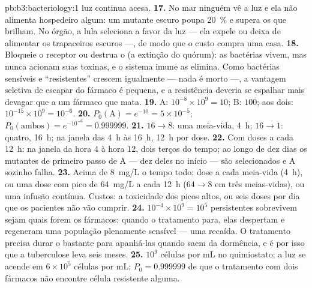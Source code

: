 \begin{solution}{pb:b3:bacteriology:1}
luz continua acesa.
\textbf{17.} No mar ninguém vê a luz e ela não alimenta hospedeiro
algum: um mutante escuro poupa \qty{20}{\%} e supera os que brilham. No
órgão, a lula seleciona a favor da luz --- ela expele ou deixa de
alimentar os trapaceiros escuros ---, de modo que o custo compra uma
casa.
\textbf{18.} Bloqueie o receptor ou destrua o  (a extinção do
quórum): as bactérias vivem, mas nunca acionam suas toxinas, e o
sistema imune as elimina. Como bactérias sensíveis e ``resistentes''
crescem igualmente --- nada é morto ---, a vantagem seletiva de escapar
do fármaco é pequena, e a resistência deveria se espalhar mais devagar
que a um fármaco que mata.
\textbf{19.} A: $10^{-8}\times 10^{9} = 10$; B: $100$; aos dois:
$10^{-15}\times
10^{9} = 10^{-6}$.
\textbf{20.} $P_{0}(\text{A}) = e^{-10} = 5\times 10^{-5}$;
$P_{0}(\text{ambos}) = e^{-10^{-6}} = 0.999999$.
\textbf{21.} $16 \to 8$: uma meia-vida, \qty{4}{h}; $16 \to 1$: quatro,
\qty{16}{h}; na janela das \qty{4}{h} às \qty{16}{h}, \qty{12}{h} por
dose.
\textbf{22.} Com doses a cada \qty{12}{h}: na janela da hora $4$ à hora
$12$, dois terços do tempo; ao longo de dez dias os mutantes de
primeiro passo de A --- dez deles no início --- são selecionados e A
sozinho falha.
\textbf{23.} Acima de \qty{8}{mg/L} o tempo todo: dose a cada meia-vida
(\qty{4}{h}), ou uma dose com pico de \qty{64}{mg/L} a cada
\qty{12}{h} ($64 \to 8$ em três meias-vidas), ou uma infusão contínua.
Custos: a toxicidade dos picos altos, ou seis doses por dia que os
pacientes não vão cumprir.
\textbf{24.} $10^{-4}\times 10^{9} = 10^{5}$ persistentes sobrevivem
sejam quais forem os fármacos; quando o tratamento para, elas despertam
e regeneram uma população plenamente sensível --- uma recaída. O
tratamento precisa durar o bastante para apanhá-las quando saem da
dormência, e é por isso que a tuberculose leva seis meses.
\textbf{25.} $10^{9}$ células por mL no quimiostato; a luz se acende em
$6\times 10^{5}$ células por mL; $P_{0} = 0.999999$ de que o tratamento
com dois fármacos não encontre célula resistente alguma.
\end{solution}
